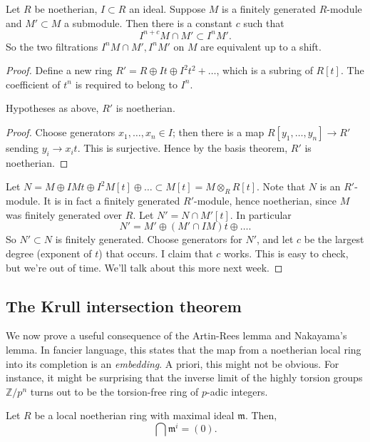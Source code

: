 \begin{theorem}
\label{artinrees}
Let $R$ be noetherian, $I \subset R$ an
ideal. Suppose $M$ is a finitely generated $R$-module and $M' \subset M$ a
submodule. Then
there is a  constant $c$ such that
\[ I^{n+c} M \cap M' \subset I^n M'.  \]
So the two filtrations $I^n M \cap M', I^n M'$ on $M$ are equivalent up to a
shift.
\end{theorem} 
\begin{proof} 
Define a new ring $R' = R \oplus It \oplus I^2 t^2 + \dots$, which is a subring
of
$R[t]$. The coefficient of $t^n $ is required to belong to $I^n$. 

\begin{lemma} 
Hypotheses as above, $R'$ is noetherian.
\end{lemma} 
\begin{proof} 
Choose generators $x_1, \dots, x_n \in I$; then there is a map $R[y_1, \dots,
y_n] \to R'$ sending $y_i \to x_i t$. This is surjective. Hence by the basis
theorem, $R'$ is noetherian.
\end{proof} 

Let $N = M \oplus  IM t \oplus I^2 M [t] \oplus \dots \subset M[t] = M
\otimes_R R[t]$. Note that $N$ is an $R'$-module. It is in fact a finitely
generated $R'$-module, hence noetherian, since $M$ was finitely generated over
$R$. Let $N' = N \cap M'[t]$. In particular
\[ N' = M' \oplus (M' \cap IM ) t \oplus \dots.  \]
So $N' \subset N$ is finitely generated. Choose generators for $N'$, and let
$c$ be the largest degree (exponent of $t$) that occurs.
I claim that $c$ works.  This is easy to check, but we're out of time. We'll
talk about this more next week. 
\end{proof} 

\subsection{The Krull intersection theorem}

We now prove a useful consequence of the Artin-Rees lemma and Nakayama's
lemma. In fancier language, this states that the map from a noetherian local
ring into its
completion is an \emph{embedding}. A priori, this might not be obvious. For
instance, it might be surprising that the inverse limit of the highly torsion
groups $\mathbb{Z}/p^n$ turns out to be the torsion-free ring of $p$-adic
integers.

\begin{theorem}[Krull] Let $R$ be a local noetherian ring with maximal ideal
$\mathfrak{m}$. Then,
\[ \bigcap \mathfrak{m}^i = (0).  \]
\end{theorem} 

